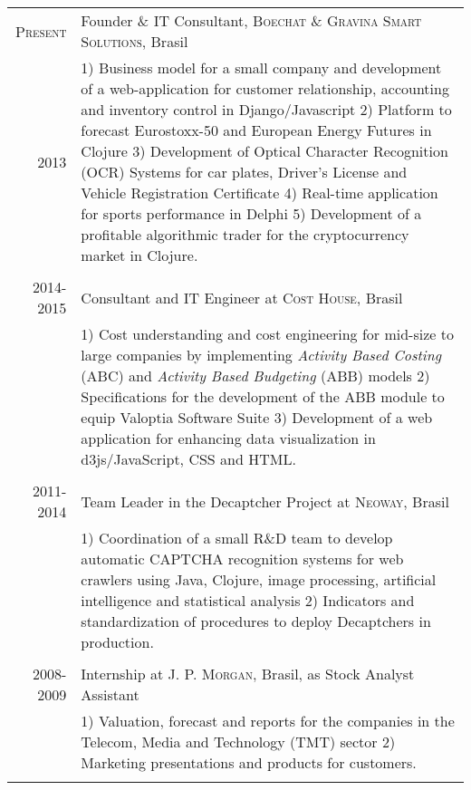 \documentclass[a4paper,10pt]{article} %
\begin{document}
\begin{tabular}{r|p{11.5cm}}
\textsc{Present} &
Founder \& IT Consultant, \textsc{Boechat \&  Gravina Smart Solutions}, Brasil \\
\textsc{2013} &
\footnotesize{
  1) Business model for a small company and
  development of a web-application for
  customer relationship, accounting and inventory control in
  Django/Javascript
  2) Platform to forecast Eurostoxx-50 and European Energy Futures in
  Clojure
  3) Development of Optical Character Recognition (OCR) Systems for
  car plates, Driver's License and Vehicle Registration Certificate
  4) Real-time application for sports performance in Delphi
  5) Development of a profitable algorithmic trader for the
  cryptocurrency market in Clojure. 
  }
\\
\multicolumn{2}{c}{} \\


  \textsc{2014-2015} &
  Consultant and IT Engineer at \textsc{Cost House}, Brasil \\
  &
  \footnotesize{
  1) Cost understanding and cost
  engineering for mid-size to large companies by implementing \textit{Activity Based
  Costing} (ABC) and \textit{Activity Based Budgeting} (ABB) models
  2) Specifications for the development of the ABB module to equip Valoptia Software
  Suite
  3) Development of a web application for enhancing data visualization
  in d3js/JavaScript, CSS and HTML. }\\
\multicolumn{2}{c}{} \\


\textsc{2011-2014} &
Team Leader in the Decaptcher Project at
\textsc{Neoway}, Brasil \\
& \footnotesize{
  1) Coordination of a small R\&D team to develop automatic
  CAPTCHA recognition systems for web crawlers using Java, Clojure,
  image processing, artificial intelligence and statistical analysis
  2) Indicators and standardization of procedures to deploy Decaptchers in production.} \\
\multicolumn{2}{c}{} \\


\textsc{2008-2009} &
Internship at \textsc{J. P. Morgan}, Brasil, as Stock Analyst Assistant \\
& \footnotesize{
  1) Valuation, forecast and reports for the companies in the Telecom,
  Media and Technology (TMT) sector
  2) Marketing presentations and products for customers.}\\
\multicolumn{2}{c}{} \\


\end{tabular}
\end{document}
